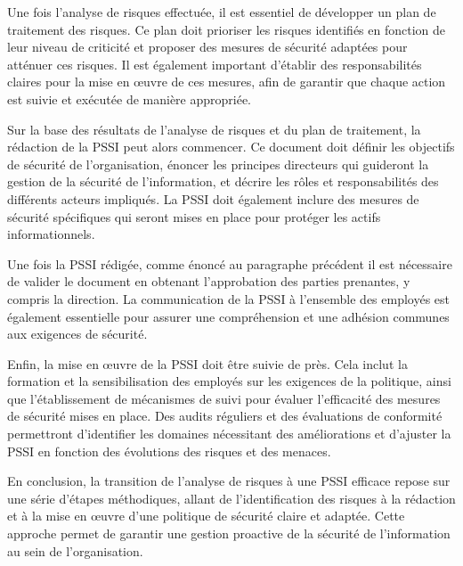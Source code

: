 Une fois l'analyse de risques effectuée, il est essentiel de développer un plan de traitement des risques. Ce plan doit prioriser les risques identifiés en fonction de leur niveau de criticité et proposer des mesures de sécurité adaptées pour atténuer ces risques. Il est également important d'établir des responsabilités claires pour la mise en œuvre de ces mesures, afin de garantir que chaque action est suivie et exécutée de manière appropriée.

Sur la base des résultats de l'analyse de risques et du plan de traitement, la rédaction de la PSSI peut alors commencer. Ce document doit définir les objectifs de sécurité de l'organisation, énoncer les principes directeurs qui guideront la gestion de la sécurité de l'information, et décrire les rôles et responsabilités des différents acteurs impliqués. La PSSI doit également inclure des mesures de sécurité spécifiques qui seront mises en place pour protéger les actifs informationnels.

Une fois la PSSI rédigée, comme énoncé au paragraphe précédent il est nécessaire de valider le document en obtenant l'approbation des parties prenantes, y compris la direction. La communication de la PSSI à l'ensemble des employés est également essentielle pour assurer une compréhension et une adhésion communes aux exigences de sécurité.

Enfin, la mise en œuvre de la PSSI doit être suivie de près. Cela inclut la formation et la sensibilisation des employés sur les exigences de la politique, ainsi que l'établissement de mécanismes de suivi pour évaluer l'efficacité des mesures de sécurité mises en place. Des audits réguliers et des évaluations de conformité permettront d'identifier les domaines nécessitant des améliorations et d'ajuster la PSSI en fonction des évolutions des risques et des menaces.

En conclusion, la transition de l'analyse de risques à une PSSI efficace repose sur une série d'étapes méthodiques, allant de l'identification des risques à la rédaction et à la mise en œuvre d'une politique de sécurité claire et adaptée. Cette approche permet de garantir une gestion proactive de la sécurité de l'information au sein de l'organisation.


